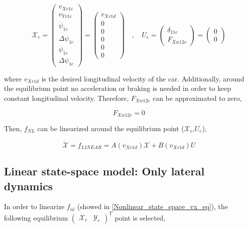 \documentclass[12pt]{article}
\begin{document}
\begin{equation}
    \mathcal{X}_e = \begin{pmatrix} v_{Xv1e} \\ v_{Yv1e} \\ \Dot{\psi}_{1e} \\ \Delta \Dot{\psi}_{1e} \\ \psi_{1e} \\ \Delta \psi_{1e} \end{pmatrix} = \begin{pmatrix} v_{Xv1d} \\ 0 \\ 0 \\ 0 \\ 0 \\ 0 \end{pmatrix} \quad , \quad U_e = \begin{pmatrix} \delta_{11e} \\ F_{Xw12e} \end{pmatrix} = \begin{pmatrix} 0 \\ 0 \end{pmatrix}
\end{equation}

where $v_{Xv1d}$ is the desired longitudinal velocity of the car. Additionally, around the equilibrium point no acceleration or braking is needed in order to keep constant longitudinal velocity. Therefore, $F_{Xw12e}$ can be approximated to zero,

\begin{equation}
    F_{Xw12e} = 0
\end{equation}

Then, $f_{NL}$ can be linearized around the equilibrium point ($\mathcal{X}_e$,$U_e$),

\begin{equation} \label{linear_expression_state}
    \dot{\mathcal{X}} = f_{LINEAR} = A (v_{Xv1d}) \mathcal{X} + B (v_{Xv1d}) U
\end{equation}

\subsection{Linear state-space model: Only lateral dynamics}
In order to linearize $f_{nl}$ (showed in \eqref{Nonlinear_state_space_vx_eq}), the following equilibrium $ \begin{pmatrix} \mathcal{X}_e & \mathcal{Y}_e\end{pmatrix}^T$ point is selected,
\end{document}
